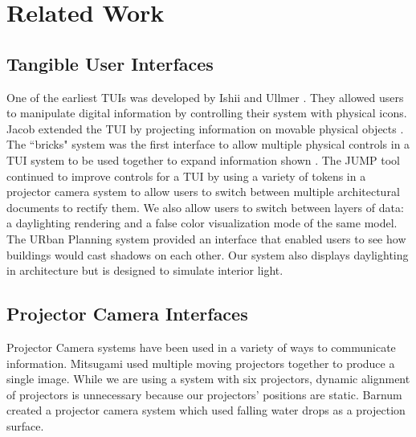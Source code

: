 \documentclass[10pt,twocolumn,letterpaper]{article}
\begin{document}
\section{Related Work}

\subsection{Tangible User Interfaces}


One of the earliest TUIs was developed by Ishii and Ullmer
\cite{Ishii97tangiblebits}.  They allowed users to manipulate digital
information by controlling their system with physical icons.  Jacob
extended the TUI by projecting information on movable physical
objects \cite{Jacob01atangible}.  The ``bricks" system was the first interface
to allow multiple physical controls in a TUI system to be used together to expand
information shown \cite{223964}.  The JUMP tool continued to
improve controls for a TUI by using a variety of tokens in a projector
camera system to allow users to switch between multiple architectural
documents to rectify them\cite{1268540}. We also allow users to switch between
layers of data: a daylighting rendering and a false color visualization mode of the
same model.  The URban Planning system provided an interface that
enabled users to see how buildings would cast shadows on each other\cite{Underkoffler:1999:ULW:302979.303114}.
Our system also displays daylighting in architecture but is designed
to simulate interior light.





\subsection{Projector Camera Interfaces}



Projector Camera systems have been used in a variety of ways to
communicate information. Mitsugami used multiple moving projectors
together to produce a single image\cite{MitsugamiUK07}.  While we are
using a system with six projectors, dynamic alignment of projectors is
unnecessary because our projectors' positions are static.  Barnum
created a projector camera system which used falling water drops as a
projection surface\cite{Barnum09aprojector-camera}.
\end{document}
